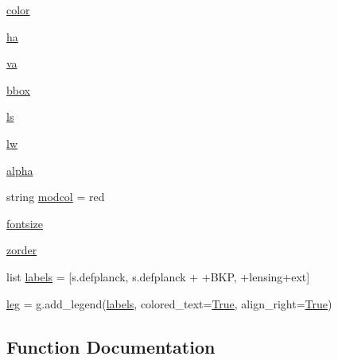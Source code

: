 \begin{DoxyCompactItemize}
\item 
\mbox{\hyperlink{namespacens__r__inflation_a9be64afa662ebbd4e8714391c1a1b0a6}{color}}
\item 
\mbox{\hyperlink{namespacens__r__inflation_a04f58eda5478de0a2724d88298e728de}{ha}}
\item 
\mbox{\hyperlink{namespacens__r__inflation_a4f3d70d70c9aba60013ba7b57faa6931}{va}}
\item 
\mbox{\hyperlink{namespacens__r__inflation_a01ef3ea41b6a748d1b2820c9f42bc07d}{bbox}}
\item 
\mbox{\hyperlink{namespacens__r__inflation_a6f05ee014ddc37fdcf41fe30d89008b2}{ls}}
\item 
\mbox{\hyperlink{namespacens__r__inflation_a3279562fc089b9cf6b89074136bdbc98}{lw}}
\item 
\mbox{\hyperlink{namespacens__r__inflation_a84bb2ad38a5117f51f6f31f944176a07}{alpha}}
\item 
string \mbox{\hyperlink{namespacens__r__inflation_ae597a378b2603b84bf3d582ba5c90e61}{modcol}} = \textquotesingle{}red\textquotesingle{}
\item 
\mbox{\hyperlink{namespacens__r__inflation_a5deb6e628b0ce4a55f4f52474c4aeedc}{fontsize}}
\item 
\mbox{\hyperlink{namespacens__r__inflation_a0122e03733b962eb1db8ec7a3977d367}{zorder}}
\item 
list \mbox{\hyperlink{namespacens__r__inflation_a520c51d166173229d57c7a2b319a28e1}{labels}} = \mbox{[}s.\+defplanck, s.\+defplanck + \textquotesingle{}+B\+KP\textquotesingle{}, \textquotesingle{}+lensing+ext\textquotesingle{}\mbox{]}
\item 
\mbox{\hyperlink{namespacens__r__inflation_acbcd29f7b821fa46159bd0d812da2b77}{leg}} = g.\+add\+\_\+legend(\mbox{\hyperlink{namespacens__r__inflation_a520c51d166173229d57c7a2b319a28e1}{labels}}, colored\+\_\+text=\mbox{\hyperlink{namespacens__r__inflation_afa3e6b64342d2f01d5b24a044663ad0b}{True}}, align\+\_\+right=\mbox{\hyperlink{namespacens__r__inflation_afa3e6b64342d2f01d5b24a044663ad0b}{True}})
\end{DoxyCompactItemize}


\subsection{Function Documentation}
\mbox{\label{namespacens__r__inflation_aaf7dedd695c74c55a95019501ac075e4}} 
